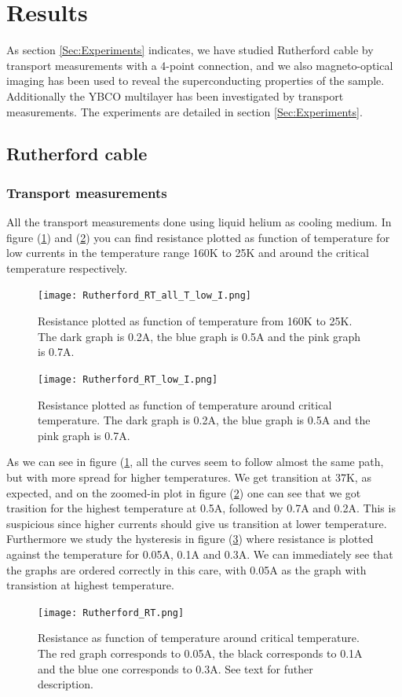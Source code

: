 \documentclass{comjnl}
\begin{document}
\section{Results}\label{Sec:Results}
As section \ref{Sec:Experiments} indicates, we have studied Rutherford cable by transport measurements with a 4-point connection, and we also magneto-optical imaging has been used to reveal the superconducting properties of the sample. Additionally the YBCO multilayer has been investigated by transport measurements. The experiments are detailed in section \ref{Sec:Experiments}.

\subsection{Rutherford cable}
\subsubsection{Transport measurements}
All the transport measurements done using liquid helium as cooling medium. In figure (\ref{fig:rutherfordRTallI}) and (\ref{fig:rutherfordRTlowI}) you can find resistance plotted as function of temperature for low currents in the temperature range 160K to 25K and around the critical temperature respectively. 
\begin{figure}[h]
\centering
\texttt{[image: Rutherford\_RT\_all\_T\_low\_I.png]}
\caption{Resistance plotted as function of temperature from 160K to 25K. The dark graph is 0.2A, the blue graph is 0.5A and the pink graph is 0.7A. \label{fig:rutherfordRTallI}}
\end{figure}
\begin{figure}[h]
\centering
\texttt{[image: Rutherford\_RT\_low\_I.png]}
\caption{Resistance plotted as function of temperature around critical temperature. The dark graph is 0.2A, the blue graph is 0.5A and the pink graph is 0.7A. \label{fig:rutherfordRTlowI}}
\end{figure}
As we can see in figure (\ref{fig:rutherfordRTallI}, all the curves seem to follow almost the same path, but with more spread for higher temperatures. We get transition at 37K, as expected, and on the zoomed-in plot in figure (\ref{fig:rutherfordRTlowI}) one can see that we got trasition for the highest temperature at 0.5A, followed by 0.7A and 0.2A. This is suspicious since higher currents should give us transition at lower temperature. Furthermore we study the hysteresis in figure (\ref{fig:rutherfordRT}) where resistance is plotted against the temperature for 0.05A, 0.1A and 0.3A. We can immediately see that the graphs are ordered correctly in this care, with 0.05A as the graph with transistion at highest temperature.
\begin{figure}[h]
\centering
\texttt{[image: Rutherford\_RT.png]}
\caption{Resistance as function of temperature around critical temperature. The red graph corresponds to 0.05A, the black corresponds to 0.1A and the blue one corresponds to 0.3A. See text for futher description. \label{fig:rutherfordRT}}
\end{figure}
\end{document}
